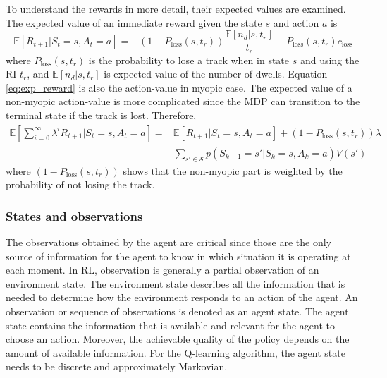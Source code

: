 \documentclass[english, 12pt, a4paper, elec, utf8, a-1b, online]{aaltothesis}
\newcommand{\ploss}{P_\text{loss}}
\newcommand{\Ss}{\mathcal{S}}
\newcommand{\E}[1]{\mathbb{E}\left[ #1 \right]}
\newcommand{\closs}{c_\text{loss}}
\newcommand{\ri}{t_r}
\begin{document}
To understand the rewards in more detail, their expected values are examined.
The expected value of an immediate reward given the state $s$ and action $a$ is
\begin{equation}\label{eq:exp_reward}
    \E{R_{t+1} | S_t=s, A_t=a} = -(1-\ploss(s, \ri)) 
        \frac
        {
            \mathbb{E} \left[ n_d | s, \ri \right]
        }
        {
        \ri
        } 
        - \ploss(s, \ri) \closs
\end{equation}
where $\ploss(s, \ri)$ is the probability to lose a track when in state $s$ and using the RI $\ri$, and $\E{n_d|s, \ri}$ is expected value of the number of dwells.
Equation \eqref{eq:exp_reward} is also the action-value in myopic case.
The expected value of a non-myopic action-value is more complicated since the MDP can transition to the terminal state if the track is lost.
Therefore, 
\begin{align}
    \E{\sum_{i=0}^\infty \lambda^i R_{t+1} | S_t=s, A_t=a} =& \E{R_{t+1} | S_t=s, A_t=a} + (1-\ploss(s, \ri)) \lambda \\
    & \sum_{s'\in \Ss} p(S_{k+1}=s'|S_{k}=s, A_{k}=a)  V(s')  
\end{align}
where $(1-\ploss(s, \ri))$ shows that the non-myopic part is weighted by the probability of not losing the track.

\subsubsection{States and observations} \label{sec:states}


The observations obtained by the agent are critical since those are the only source of information for the agent to know in which situation it is operating at each moment.
In RL, observation is generally a partial observation of an environment state.
The environment state describes all the information that is needed to determine how the environment responds to an action of the agent. 
An observation or sequence of observations is denoted as an agent state.
The agent state contains the information that is available and relevant for the agent to choose an action.
Moreover, the achievable quality of the policy depends on the amount of available information.
For the Q-learning algorithm, the agent state needs to be discrete and approximately Markovian.
\end{document}
